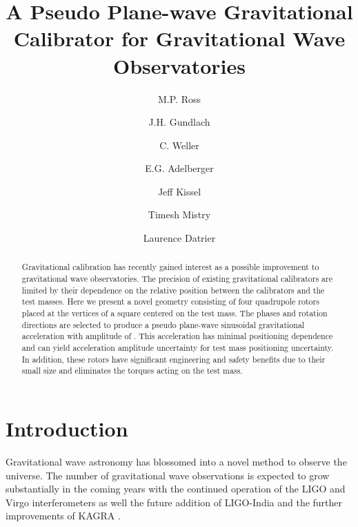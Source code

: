 \documentclass[superscriptaddress, twocolumn, prd]{revtex4-1}
\begin{document}
\title{A Pseudo Plane-wave Gravitational Calibrator for Gravitational Wave Observatories}

\author{M.P. Ross}
\author{J.H. Gundlach}
\author{C. Weller}
\author{E.G. Adelberger}
\author{Jeff Kissel}
\author{Timesh Mistry}
\author{Laurence Datrier}


\begin{abstract}

Gravitational calibration has recently gained interest as a possible improvement to gravitational wave observatories. The precision of existing gravitational calibrators are limited by their dependence on the relative position between the calibrators and the test masses. Here we present a novel geometry consisting of four quadrupole rotors placed at the vertices of a square centered on the test mass. The phases and rotation directions are selected to produce a pseudo plane-wave  sinusoidal gravitational acceleration with amplitude of . This acceleration has minimal positioning dependence and can yield  acceleration amplitude uncertainty for \added{$\sim$1 cm} test mass positioning uncertainty. In addition, these rotors have significant engineering and safety benefits due to their small size and eliminates the torques acting on the test mass.

\end{abstract}

\maketitle

\section{Introduction}

Gravitational wave astronomy has blossomed into a novel method to observe the universe. The number of gravitational wave observations is expected to grow substantially in the coming years with the continued operation of the LIGO \cite{aLIGO} and Virgo \cite{virgo} interferometers as well the future addition of LIGO-India \cite{ligo-india} and the further improvements of KAGRA \cite{kagra}. 
\end{document}
